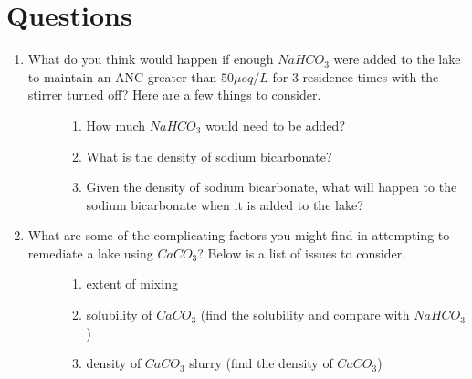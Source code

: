 \documentclass[letterpaper,10pt,english]{sphinxmanual}
\begin{document}
\section{Questions}
\label{\detokenize{Acid_Rain/Acid_Rain:questions}}\label{\detokenize{Acid_Rain/Acid_Rain:heading-acid-rain-questions}}\begin{enumerate}
\item {} \begin{description}
\item[{What do you think would happen if enough \(NaHCO_3\) were added to the lake to maintain an ANC greater than \(50 \mu eq/L\) for 3 residence times with the stirrer turned off? Here are a few things to consider.}] \leavevmode\begin{enumerate}
\item {} 
How much \(NaHCO_3\) would need to be added?

\item {} 
What is the density of sodium bicarbonate?

\item {} 
Given the density of sodium bicarbonate, what will happen to the sodium bicarbonate when it is added to the lake?

\end{enumerate}

\end{description}

\item {} \begin{description}
\item[{What are some of the complicating factors you might find in attempting to remediate a lake using \(CaCO_3\)? Below is a list of issues to consider.}] \leavevmode\begin{enumerate}
\item {} 
extent of mixing

\item {} 
solubility of \(CaCO_3\) (find the solubility and compare with \(NaHCO_3\))

\item {} 
density of \(CaCO_3\) slurry (find the density of \(CaCO_3\))

\end{enumerate}

\end{description}

\end{enumerate}
\end{document}
